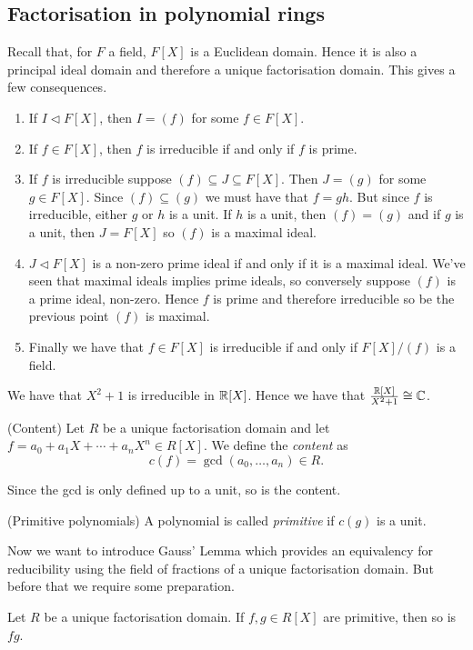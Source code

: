 \documentclass{article}
\newcommand{\nrm}{\triangleleft}
\begin{document}
\subsection{Factorisation in polynomial rings}
Recall that, for $ F $ a field, $ F[X] $ is a Euclidean domain. Hence it is also a principal ideal domain and therefore a unique factorisation domain. This gives a few consequences.
\begin{enumerate}
	\item If $ I\nrm F[X] $, then $ I=(f) $ for some $ f\in F[X] $.
	\item If $ f\in F[X] $, then $ f $ is irreducible if and only if $ f $ is prime.
	\item If $ f $ is irreducible suppose $ (f)\subseteq J\subseteq F[X] $. Then $ J=(g) $ for some $ g\in F[X] $. Since $ (f)\subseteq (g) $ we must have that $ f=gh $. But since $ f $ is irreducible, either $ g $ or $ h $ is a unit. If $ h $ is a unit, then $ (f)=(g) $ and if $ g $ is a unit, then $ J=F[X] $ so $ (f) $ is a maximal ideal.
	\item $ J\nrm F[X] $ is a non-zero prime ideal if and only if it is a maximal ideal. We've seen that maximal ideals implies prime ideals, so conversely suppose $ (f) $ is a prime ideal, non-zero. Hence $ f $ is prime and therefore irreducible so be the previous point $ (f) $ is maximal.
	\item Finally we have that $ f\in F[X] $ is irreducible if and only if $ F[X]/(f) $ is a field.
\end{enumerate} 
We have that $ X^2+1 $ is irreducible in $ \mathbb{R}[X] $. Hence we have that $ \frac{\mathbb{R}[X]}{X^2+1}\cong\mathbb{C} $.
\begin{definition}
	(Content) Let $ R $ be a unique factorisation domain and let $ f=a_0+a_1X+\cdots+a_nX^n\in R[X] $. We define the \textit{content} as
	\[
	  c(f)=\gcd(a_0,\dots,a_n)\in R.
	\]
\end{definition}
Since the gcd is only defined up to a unit, so is the content.
\begin{definition}
	(Primitive polynomials) A polynomial is called \textit{primitive} if $ c(g) $ is a unit.
\end{definition}
Now we want to introduce Gauss' Lemma which provides an equivalency for reducibility using the field of fractions of a unique factorisation domain. But before that we require some preparation.
\begin{lemma}
	Let $ R $ be a unique factorisation domain. If $ f,g\in R[X] $ are primitive, then so is $ fg $.
\end{lemma}
\end{document}
